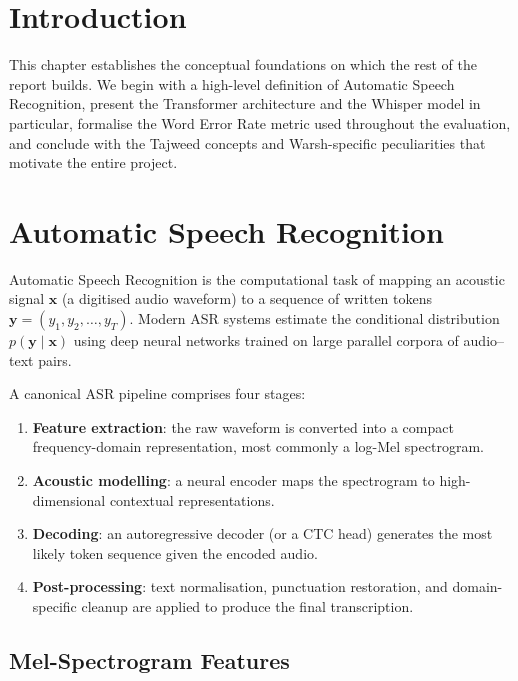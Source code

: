 \documentclass[12pt,a4paper]{report}
\begin{document}
\section{Introduction}
This chapter establishes the conceptual foundations on which the rest of the
report builds. We begin with a high-level definition of Automatic Speech
Recognition, present the Transformer architecture and the Whisper model in
particular, formalise the Word Error Rate metric used throughout the
evaluation, and conclude with the Tajweed concepts and Warsh-specific
peculiarities that motivate the entire project.

\section{Automatic Speech Recognition}
\label{sec:mt_asr}

\begin{emeraldbox}[title=Automatic Speech Recognition (ASR)]
Automatic Speech Recognition is the computational task of mapping an
acoustic signal $\mathbf{x}$ (a digitised audio waveform) to a sequence of
written tokens $\mathbf{y} = (y_1, y_2, \dots, y_T)$. Modern ASR systems
estimate the conditional distribution $p(\mathbf{y}\mid\mathbf{x})$ using
deep neural networks trained on large parallel corpora of audio--text
pairs.
\end{emeraldbox}

A canonical ASR pipeline comprises four stages:

\begin{enumerate}
  \item \textbf{Feature extraction}: the raw waveform is converted into a
        compact frequency-domain representation, most commonly a log-Mel
        spectrogram.
  \item \textbf{Acoustic modelling}: a neural encoder maps the spectrogram
        to high-dimensional contextual representations.
  \item \textbf{Decoding}: an autoregressive decoder (or a CTC head)
        generates the most likely token sequence given the encoded audio.
  \item \textbf{Post-processing}: text normalisation, punctuation
        restoration, and domain-specific cleanup are applied to produce the
        final transcription.
\end{enumerate}

\subsection{Mel-Spectrogram Features}
\end{document}
